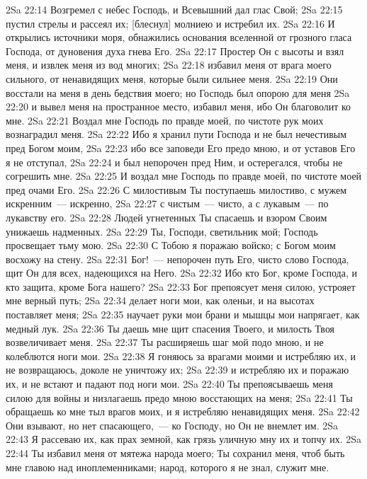 \vs 2Sa 22:14 Возгремел с небес Господь, и Всевышний дал глас Свой;
\vs 2Sa 22:15 пустил стрелы и рассеял их; [блеснул] молниею и истребил их.
\vs 2Sa 22:16 И открылись источники моря, обнажились основания вселенной от грозного гласа Господа, от дуновения духа гнева Его.
\vs 2Sa 22:17 Простер Он  с высоты и взял меня, и извлек меня из вод многих;
\vs 2Sa 22:18 избавил меня от врага моего сильного, от ненавидящих меня, которые были сильнее меня.
\vs 2Sa 22:19 Они восстали на меня в день бедствия моего; но Господь был опорою для меня
\vs 2Sa 22:20 и вывел меня на пространное место, избавил меня, ибо Он благоволит ко мне.
\vs 2Sa 22:21 Воздал мне Господь по правде моей, по чистоте рук моих вознаградил меня.
\vs 2Sa 22:22 Ибо я хранил пути Господа и не был нечестивым пред Богом моим,
\vs 2Sa 22:23 ибо все заповеди Его предо мною, и от уставов Его я не отступал,
\vs 2Sa 22:24 и был непорочен пред Ним, и остерегался, чтобы не согрешить мне.
\vs 2Sa 22:25 И воздал мне Господь по правде моей, по чистоте моей пред очами Его.
\vs 2Sa 22:26 С милостивым Ты поступаешь милостиво, с мужем искренним~--- искренно,
\vs 2Sa 22:27 с чистым~--- чисто, а с лукавым~--- по лукавству его.
\vs 2Sa 22:28 Людей угнетенных Ты спасаешь и взором Своим унижаешь надменных.
\vs 2Sa 22:29 Ты, Господи, светильник мой; Господь просвещает тьму мою.
\vs 2Sa 22:30 С Тобою я поражаю войско; с Богом моим восхожу на стену.
\vs 2Sa 22:31 Бог!~--- непорочен путь Его, чисто слово Господа, щит Он для всех, надеющихся на Него.
\vs 2Sa 22:32 Ибо кто Бог, кроме Господа, и кто защита, кроме Бога нашего?
\vs 2Sa 22:33 Бог препоясует меня силою, устрояет мне верный путь;
\vs 2Sa 22:34 делает ноги мои, как оленьи, и на высотах поставляет меня;
\vs 2Sa 22:35 научает руки мои брани и мышцы мои напрягает, как медный лук.
\vs 2Sa 22:36 Ты даешь мне щит спасения Твоего, и милость Твоя возвеличивает меня.
\vs 2Sa 22:37 Ты расширяешь шаг мой подо мною, и не колеблются ноги мои.
\vs 2Sa 22:38 Я гоняюсь за врагами моими и истребляю их, и не возвращаюсь, доколе не уничтожу их;
\vs 2Sa 22:39 и истребляю их и поражаю их, и не встают и падают под ноги мои.
\vs 2Sa 22:40 Ты препоясываешь меня силою для войны и низлагаешь предо мною восстающих на меня;
\vs 2Sa 22:41 Ты обращаешь ко мне тыл врагов моих, и я истребляю ненавидящих меня.
\vs 2Sa 22:42 Они взывают, но нет спасающего,~--- ко Господу, но Он не внемлет им.
\vs 2Sa 22:43 Я рассеваю их, как прах земной, как грязь уличную мну их и топчу их.
\vs 2Sa 22:44 Ты избавил меня от мятежа народа моего; Ты сохранил меня, чтоб быть мне главою над иноплеменниками; народ, которого я не знал, служит мне.
